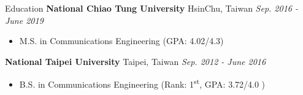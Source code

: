 \documentclass{resume} %
\newcommand{\ts}{\textsuperscript}
\begin{document}

\begin{rSection}{Education}
{\bf National Chiao Tung University} \hfill {HsinChu, Taiwan} \hfill {\em Sep. 2016 - June 2019}
\begin{itemize} \item {M.S. in Communications Engineering (GPA: 4.02/4.3)} \end{itemize}
{\bf National Taipei University} \hfill {Taipei, Taiwan} \hfill {\em Sep. 2012 - June 2016}
\begin{itemize} \item {B.S. in Communications Engineering (Rank: 1\ts{st}, GPA: 3.72/4.0 )} \end{itemize}
\end{rSection}

\end{document}
